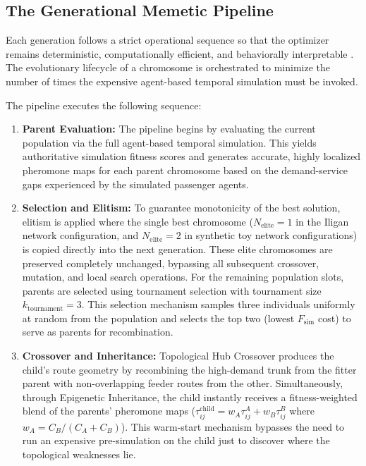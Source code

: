 {{%
\subsection{The Generational Memetic Pipeline}
\label{sec:pipeline}
\noindent
Each generation follows a strict operational sequence so that the optimizer remains deterministic, computationally efficient, and behaviorally interpretable \citep{sastry2013genetic}. The evolutionary lifecycle of a chromosome is orchestrated to minimize the number of times the expensive agent-based temporal simulation must be invoked. 

The pipeline executes the following sequence:
\begin{enumerate}
    \item \textbf{Parent Evaluation:} The pipeline begins by evaluating the current population via the full agent-based temporal simulation. This yields authoritative simulation fitness scores and generates accurate, highly localized pheromone maps for each parent chromosome based on the demand-service gaps experienced by the simulated passenger agents.
    \item \textbf{Selection and Elitism:} To guarantee monotonicity of the best solution, elitism is applied where the single best chromosome ($N_{\text{elite}} = 1$ in the Iligan network configuration, and $N_{\text{elite}} = 2$ in synthetic toy network configurations) is copied directly into the next generation. These elite chromosomes are preserved completely unchanged, bypassing all subsequent crossover, mutation, and local search operations. For the remaining population slots, parents are selected using tournament selection with tournament size $k_{\text{tournament}} = 3$. This selection mechanism samples three individuals uniformly at random from the population and selects the top two (lowest $F_{\text{sim}}$ cost) to serve as parents for recombination.
    \item \textbf{Crossover and Inheritance:} Topological Hub Crossover produces the child's route geometry by recombining the high-demand trunk from the fitter parent with non-overlapping feeder routes from the other. Simultaneously, through Epigenetic Inheritance, the child instantly receives a fitness-weighted blend of the parents' pheromone maps ($\tau^{\text{child}}_{ij} = w_A \tau^A_{ij} + w_B \tau^B_{ij}$ where $w_A = C_B / (C_A + C_B)$). This warm-start mechanism bypasses the need to run an expensive pre-simulation on the child just to discover where the topological weaknesses lie.

\end{enumerate}}}
